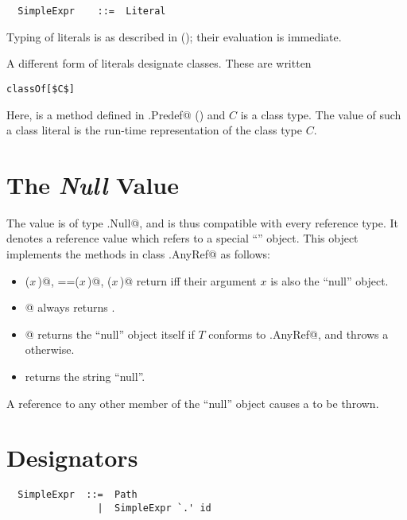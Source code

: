 \syntax\begin{lstlisting}
  SimpleExpr    ::=  Literal
\end{lstlisting}

Typing of literals is as described in (); their
evaluation is immediate.

A different form of literals designate classes. These are written 
\begin{lstlisting}
classOf[$C$]
\end{lstlisting}
Here, \lstinline@classOf@ is a method defined in \lstinline@scala.Predef@
() and $C$ is a class type. The value of such a class literal is the
run-time representation of the class type $C$.

\section{The {\em Null} Value}

The  value is of type \lstinline@scala.Null@, and is thus
compatible with every reference type.  It denotes a reference value
which refers to a special ``\lstinline@null@'' object. This object
implements the methods in class \lstinline@scala.AnyRef@ as follows:
\begin{itemize}
\item
\lstinline@eq($x\,$)@, \lstinline@==($x\,$)@, \lstinline@equals($x\,$)@ return  iff their
argument $x$ is also the ``null'' object.
\item
\lstinline@isInstanceOf[$T\,$]@ always returns .
\item
\lstinline@asInstanceOf[$T\,$]@ returns the ``null'' object itself if
$T$ conforms to \lstinline@scala.AnyRef@, and throws a
\lstinline@NullPointerException@ otherwise.
\item
{} returns the string ``null''.
\end{itemize}
A reference to any other member of the ``null'' object causes a
 to be thrown. 

\section{Designators}
\label{sec:designators}

\syntax\begin{lstlisting}
  SimpleExpr  ::=  Path
                |  SimpleExpr `.' id
\end{lstlisting}

